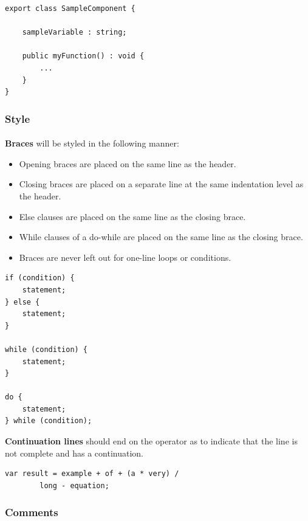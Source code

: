 \documentclass{article}
\begin{document}
    \begin{lstlisting}
export class SampleComponent {

    sampleVariable : string;

    public myFunction() : void {
        ...
    }
}
    \end{lstlisting}

    \subsubsection{Style}
    \label{sec:typescript-st}

    \paragraph{}
    \textbf{Braces} will be styled in the following manner:
    \begin{itemize}
        \item Opening braces are placed on the same line as the header.
        \item Closing braces are placed on a separate line at the same
                indentation level as the header.
        \item Else clauses are placed on the same line as the closing brace.
        \item While clauses of a do-while are placed on the same line as the
                closing brace.
        \item Braces are never left out for one-line loops or conditions.
    \end{itemize}

    \begin{lstlisting}
if (condition) {
    statement;
} else {
    statement;
}

while (condition) {
    statement;
}

do {
    statement;
} while (condition);
    \end{lstlisting}

    \textbf{Continuation lines} should end on the operator as to indicate that
    the line is not complete and has a continuation.

    \begin{lstlisting}
var result = example + of + (a * very) / 
        long - equation;
    \end{lstlisting}

    \subsubsection{Comments}
    \label{sec:typescript-com}
\end{document}
